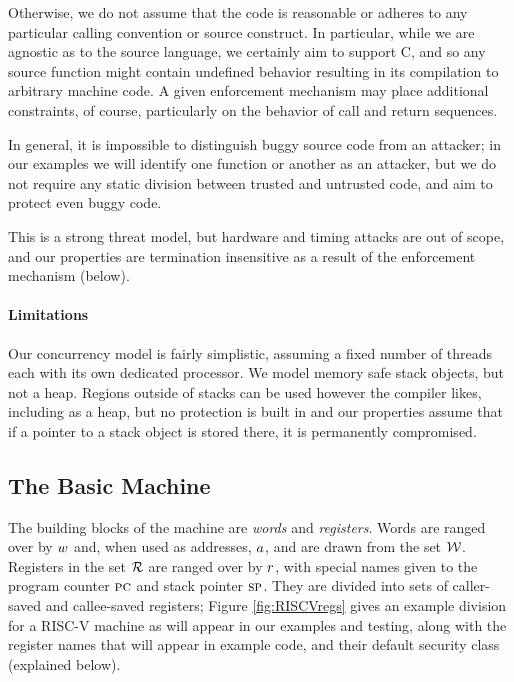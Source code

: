 \documentclass[10pt,conference]{ieeetran}%
\theoremstyle{definition}
\begin{document}
Otherwise, we do not assume that the code is reasonable or adheres to any particular
calling convention or source construct. In particular, while we are agnostic as to the source
language, we certainly aim to support C, and so any source function might contain undefined
behavior resulting in its compilation to arbitrary machine code. A given enforcement
mechanism may place additional constraints, of course, particularly on the behavior of
call and return sequences.

In general, it is impossible to distinguish buggy source code from an attacker; in
our examples we will identify one function or another as an attacker, but we do not
require any static division between trusted and untrusted code, and aim to protect
even buggy code.

This is a strong threat model, but hardware and timing attacks are out of scope,
and our properties are termination insensitive as a result of the enforcement mechanism
(below).

\paragraph*{Limitations}

Our concurrency model is fairly
simplistic, assuming a fixed number of threads each with its own dedicated processor.
We model memory safe stack objects, but not a heap. Regions outside of
stacks can be used however the compiler likes, including as a heap, but no protection is
built in and our properties assume that if a pointer to a stack object is stored there,
it is permanently compromised.

\subsection{The Basic Machine}

The building blocks of the machine are {\em words} and {\em registers}.
Words are ranged over by \(w\) and, when used as addresses, \(a\),
and are drawn from the set \({\mathcal W}\).
Registers in the set \({\mathcal R}\) are ranged over by \(r\), with special names given to the
program counter \(\textsc{pc}\) and stack pointer \(\textsc{sp}\).
They are divided into sets of caller-saved and callee-saved registers;
Figure \ref{fig:RISCVregs} gives an example division for a RISC-V machine as will
appear in our examples and testing, along with the register names that will appear in
example code, and their default security class (explained below).
\end{document}
